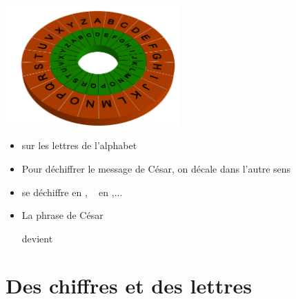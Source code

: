 \begin{frame}

\centerline{\includegraphics[width=0.5\textwidth]{figures/Cesar_3.png}}

\pause

\begin{itemize}
  \item {} sur les lettres de l'alphabet
\pause  
  \item Pour déchiffrer le message de César, on décale dans l'autre sens
\pause  
  \item {} se déchiffre en , \  en ,...
\pause
  \item La phrase de César \\
  \centerline{}
  \pause
  devient \\
\centerline{}
\end{itemize}

\end{frame}




\section{Des chiffres et des lettres}

